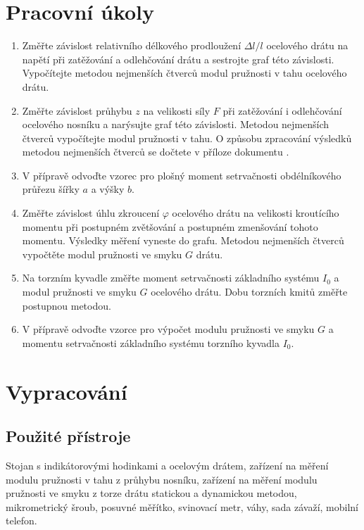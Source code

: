 \documentclass[english]{article}
\begin{document}


\setlength{\parindent}{0.5cm}

\section{Pracovní úkoly}
		\begin{enumerate}
		\item Změřte závislost relativního délkového prodloužení $\Delta l / l$ ocelového drátu na napětí při zatěžování a odlehčování drátu a sestrojte graf této závislosti. Vypočítejte metodou nejmenších čtverců modul pružnosti v tahu ocelového drátu.
		\item Změřte závislost průhybu $z$ na velikosti síly $F$ při zatěžování i odlehčování ocelového nosníku a narýsujte graf této závislosti. Metodou nejmenších čtverců vypočítejte modul pružnosti v tahu. O způsobu zpracování výsledků metodou nejmenších čtverců se dočtete v příloze dokumentu \cite{bib:zadani}.
		\item V přípravě odvoďte vzorec pro plošný moment setrvačnosti obdélníkového průřezu šířky $a$ a výšky $b$.
		\item Změřte závislost úhlu zkroucení $\varphi$ ocelového drátu na velikosti kroutícího momentu při postupném zvětšování a postupném zmenšování tohoto momentu. Výsledky měření vyneste do grafu. Metodou nejmenších čtverců vypočtěte modul pružnosti ve smyku $G$ drátu.
		\item Na torzním kyvadle změřte moment setrvačnosti základního systému $I_0$ a modul pružnosti ve smyku $G$ ocelového drátu. Dobu torzních kmitů změřte postupnou metodou.
		\item V přípravě odvoďte vzorce pro výpočet modulu pružnosti ve smyku $G$ a momentu setrvačnosti základního systému torzního kyvadla $I_0$.
		\end{enumerate}
	
\section{Vypracování}

	\subsection{Použité přístroje}
			Stojan s indikátorovými hodinkami a ocelovým drátem, zařízení na měření modulu pružnosti v tahu z průhybu nosníku, zařízení na měření modulu pružnosti ve smyku z torze drátu statickou a dynamickou metodou, mikrometrický šroub, posuvné měřítko, svinovací metr, váhy,  sada závaží, mobilní telefon. 
	
\end{document}
